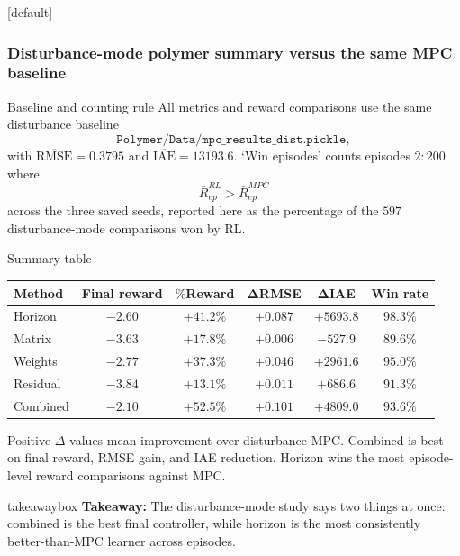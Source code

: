 \documentclass[aspectratio=169]{beamer}
\newcommand{\takeawaybox}[1]{%
\vspace{0.01cm}
\begin{center}
\begin{beamercolorbox}[wd=0.94\textwidth,sep=3pt,center,rounded=true,shadow=false]{takeawaybox}
\scriptsize
\textbf{\textcolor{maroon1}{Takeaway:}} #1
\end{beamercolorbox}
\end{center}
}
\begin{document}
\begin{frame}
[default]
\frametitle{\large \textbf{Disturbance-mode polymer summary versus the same MPC baseline}}
\tiny
\vspace{-0.30cm}

\begin{block}{Baseline and counting rule}
\justifying
All metrics and reward comparisons use the same disturbance baseline
\[
\texttt{Polymer/Data/mpc\_results\_dist.pickle},
\]
with \(\overline{\mathrm{RMSE}}=0.3795\) and \(\overline{\mathrm{IAE}}=13193.6\). `Win episodes' counts episodes \(2{:}200\) where
\[
\bar{R}^{RL}_{ep} > \bar{R}^{MPC}_{ep}
\]
across the three saved seeds, reported here as the percentage of the \(597\) disturbance-mode comparisons won by RL.
\end{block}

\vspace{0.02cm}

\begin{block}{Summary table}
\centering
\tiny
\renewcommand{\arraystretch}{1.10}
\begin{tabular}{lccccc}
\textbf{Method} & \textbf{Final reward} & \(\boldsymbol{\%}\)\textbf{Reward} & \(\boldsymbol{\Delta}\)\textbf{RMSE} & \(\boldsymbol{\Delta}\)\textbf{IAE} & \textbf{Win rate} \\
\hline
Horizon & \(-2.60\) & \(+41.2\%\) & \(+0.087\) & \(+5693.8\) & \(98.3\%\) \\
Matrix & \(-3.63\) & \(+17.8\%\) & \(+0.006\) & \(-527.9\) & \(89.6\%\) \\
Weights & \(-2.77\) & \(+37.3\%\) & \(+0.046\) & \(+2961.6\) & \(95.0\%\) \\
Residual & \(-3.84\) & \(+13.1\%\) & \(+0.011\) & \(+686.6\) & \(91.3\%\) \\
Combined & \(-2.10\) & \(+52.5\%\) & \(+0.101\) & \(+4809.0\) & \(93.6\%\) \\
\end{tabular}
\end{block}

\vspace{0.02cm}

\vspace{0.02cm}
\justifying
Positive \(\Delta\) values mean improvement over disturbance MPC.
Combined is best on final reward, RMSE gain, and IAE reduction.
Horizon wins the most episode-level reward comparisons against MPC.

\takeawaybox{The disturbance-mode study says two things at once: combined is the best final controller, while horizon is the most consistently better-than-MPC learner across episodes.}

\end{frame}
\end{document}
